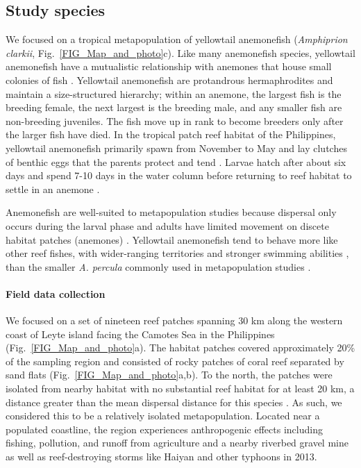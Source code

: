 \documentclass[12pt, oneside]{article}   	%
\begin{document}
\subsection*{Study species}

We focused on a tropical metapopulation of yellowtail anemonefish (\textit{Amphiprion clarkii}, Fig.\ \ref{FIG_Map_and_photo}c). Like many anemonefish species, yellowtail anemonefish have a mutualistic relationship with anemones that house small colonies of fish \citep{buston2003social, fautin1992field}. Yellowtail anemonefish are protandrous hermaphrodites and maintain a size-structured hierarchy; within an anemone, the largest fish is the breeding female, the next largest is the breeding male, and any smaller fish are non-breeding juveniles. The fish move up in rank to become breeders only after the larger fish have died. In the tropical patch reef habitat of the Philippines, yellowtail anemonefish primarily spawn from November to May and lay clutches of benthic eggs that the parents protect and tend \citep{ochi1989mating, holtswarth2017fecundity}. Larvae hatch after about six days and spend 7-10 days in the water column before returning to reef habitat to settle in an anemone \citep{fautin1992field}.

Anemonefish are well-suited to metapopulation studies because dispersal only occurs during the larval phase and adults have limited movement on discete habitat patches (anemones) \citep[e.g.,][]{buston2013marine, salles_coral_2015, almany2017larval}. Yellowtail anemonefish tend to behave more like other reef fishes, with wider-ranging territories and stronger swimming abilities \citep{hattori1991life, ochi1989mating}, than the smaller \textit{A. percula} commonly used in metapopulation studies \citep[e.g.][]{buston2011probability, salles_coral_2015}. %

\paragraph*{Field data collection}

We focused on a set of nineteen reef patches spanning 30 km along the western coast of Leyte island facing the Camotes Sea in the Philippines (Fig.\ \ref{FIG_Map_and_photo}a). The habitat patches covered approximately 20\% of the sampling region and consisted of rocky patches of coral reef separated by sand flats (Fig.\ \ref{FIG_Map_and_photo}a,b). To the north, the patches were isolated from nearby habitat with no substantial reef habitat for at least 20 km, a distance greater than the mean dispersal distance for this species \citep{pinsky2010using}. As such, we considered this to be a relatively isolated metapopulation. Located near a populated coastline, the region experiences anthropogenic effects including fishing, pollution, and runoff from agriculture and a nearby riverbed gravel mine as well as reef-destroying storms like Haiyan and other typhoons in 2013.%
\end{document}
